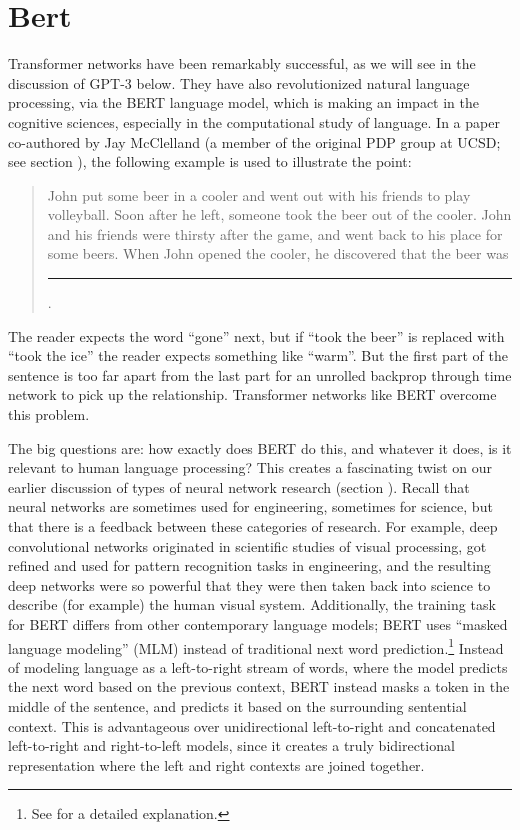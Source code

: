 \section{Bert}

Transformer networks have been remarkably successful, as we will see in the discussion of GPT-3 below. They have also revolutionized natural language processing, via the BERT language model, which is making an impact in the cognitive sciences, especially in the computational study of language. In a paper co-authored by Jay McClelland  \cite{mcclelland2020placing} (a member of the original PDP group at UCSD; see section ), the following example is used to illustrate the point:
\begin{quote}
John put some beer in a cooler and went out with his friends to play volleyball. Soon after he left, someone took the beer out of the cooler. John and his friends were thirsty after the game, and went back to his place for some beers. When John opened the cooler, he discovered that the beer was \rule{1cm}{0.15mm}.
\end{quote}
The reader expects the word ``gone'' next, but if ``took the beer'' is replaced with ``took the ice'' the reader expects something like ``warm''. But the first part of the sentence is too far apart from the last part for an unrolled backprop through time network to pick up the relationship.  Transformer networks like BERT overcome this problem.

The big questions are: how exactly does BERT do this, and whatever it does, is it relevant to human language processing?  This creates a fascinating twist on our earlier discussion of types of neural network research (section ). Recall that neural networks are sometimes used for engineering, sometimes for science, but that there is a feedback between these categories of research. For example, deep convolutional networks originated in scientific studies of visual processing, got refined and used for pattern recognition tasks in engineering, and the resulting deep networks were so powerful that they were then taken back into science  to describe (for example) the human visual system.
Additionally, the training task for BERT differs from other contemporary language models; BERT uses ``masked language modeling'' (MLM) instead of traditional next word prediction.\footnote{See \cite{devlin2018bert} for a detailed explanation.} Instead of modeling language as a left-to-right stream of words, where the model predicts the next word based on the previous context, BERT instead masks a token in the middle of the sentence, and predicts it based on the surrounding sentential context. This is advantageous over unidirectional left-to-right and concatenated left-to-right and right-to-left models, since it creates a truly bidirectional representation where the left and right contexts are joined together.

